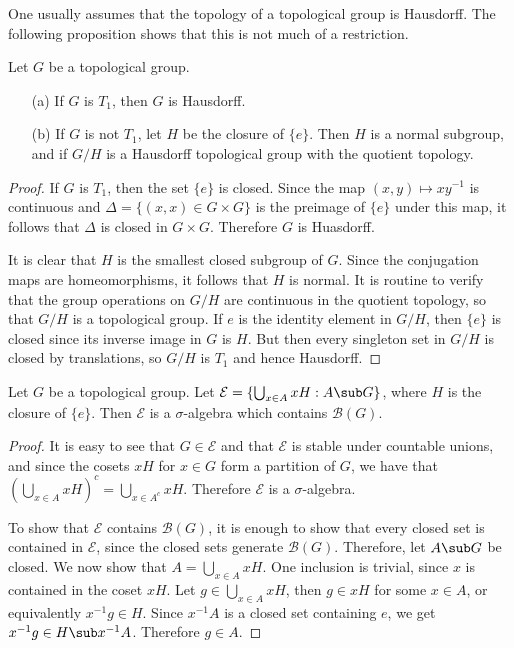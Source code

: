 One usually assumes that the topology of a topological group is Hausdorff. The following proposition shows that this is not much of a restriction.
\begin{proposition}\label{topological group Hausdorff}
Let $G$ be a topological group.
\begin{itemize}
\item[(a)] If $G$ is $T_1$, then $G$ is Hausdorff.
\item[(b)] If $G$ is not $T_1$, let $H$ be the closure of $\{e\}$. Then $H$ is a normal subgroup, and if $G/H$ is a Hausdorff topological group with the quotient topology.
\end{itemize}
\end{proposition}
\begin{proof}
If $G$ is $T_1$, then the set $\{e\}$ is closed. Since the map $(x,y)\mapsto xy^{-1}$ is continuous and $\Delta=\{(x,x)\in G\times G\}$ is the preimage of $\{e\}$ under this map, it follows that $\Delta$ is closed in $G\times G$. Therefore $G$ is Huasdorff.\par
It is clear that $H$ is the smallest closed subgroup of $G$. Since the conjugation maps are homeomorphisms, it follows that $H$ is normal. It is routine to verify that the group operations on $G/H$ are continuous in the quotient topology, so that $G/H$ is a topological group. If $e$ is the identity element in $G/H$, then $\{e\}$ is closed since its inverse image in $G$ is $H$. But then every singleton set in $G/H$ is closed by translations, so $G/H$ is $T_1$ and hence Hausdorff. 
\end{proof}
\begin{lemma}\label{topological group closure of identity sigma-alg}
Let $G$ be a topological group. Let $\mathcal{E}=\{\bigcup_{x\in A}xH:A\sub G\}$, where $H$ is the closure of $\{e\}$. Then $\mathcal{E}$ is a $\sigma$-algebra which contains $\mathcal{B}(G)$.
\end{lemma}
\begin{proof}
It is easy to see that $G\in\mathcal{E}$ and that $\mathcal{E}$ is stable under countable unions, and since the cosets $xH$ for $x\in G$ form a partition of $G$, we have that $(\bigcup_{x\in A}xH)^c=\bigcup_{x\in A^c}xH$. Therefore $\mathcal{E}$ is a $\sigma$-algebra.\par
To show that $\mathcal{E}$ contains $\mathcal{B}(G)$, it is enough to show that every closed set is contained in $\mathcal{E}$, since the closed sets generate $\mathcal{B}(G)$. Therefore, let $A\sub G$ be closed. We now show that $A=\bigcup_{x\in A}xH$. One inclusion is trivial, since $x$ is contained in the coset $xH$. Let $g\in\bigcup_{x\in A}xH$, then $g\in xH$ for some $x\in A$, or equivalently $x^{-1}g\in H$. Since $x^{-1}A$ is a closed set containing $e$, we get $x^{-1}g\in H\sub x^{-1}A$. Therefore $g\in A$.
\end{proof}

